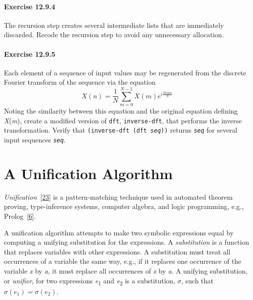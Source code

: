 \paragraph{Exercise \label{examples_g202}12.9.4}


\label{examples_s74}The recursion step creates several intermediate lists that are
immediately discarded.
Recode the recursion step to avoid any unnecessary allocation.


\paragraph{Exercise \label{examples_g203}12.9.5}


\label{examples_s75}Each element of a sequence of input values may be regenerated from
the discrete Fourier transform of the sequence via the equation
\[X(n)=\frac{1}{N}\sum_{m=0}^{N-1}X(m)e^{i\frac{2\pi{}mn}{N}}\]
Noting the similarity between this equation and the original equation
defining \textit{X}(\textit{m}), create a modified version of \texttt{dft},
\texttt{inverse-dft}, that performs the inverse transformation.
Verify that \texttt{(inverse-dft (dft \textit{seq}))} returns
\texttt{\textit{seq}} for several input sequences \texttt{\textit{seq}}.

\section{\label{examples_g204}\label{examples_h10}A Unification Algorithm\label{examples_SECTEXUNIFY}}



\textit{Unification} [\hyperref[bibliography_g241]{23}] is a pattern-matching technique
used in automated theorem proving, type-inference systems, computer
algebra, and logic programming, e.g., Prolog [\hyperref[bibliography_g224]{6}].


A \label{examples_s76}unification algorithm attempts to make two symbolic expressions
equal by computing a unifying substitution for the expressions.
A \textit{substitution} is a function that replaces variables with other
expressions.
A substitution must treat all occurrences of a variable the same way,
e.g., if it replaces one occurrence of the variable \textit{x} by \textit{a}, it must
replace all occurrences of \textit{x} by \textit{a}.
A unifying substitution, or \textit{unifier}, for two expressions \textit{e}\textsubscript{1} and
\textit{e}\textsubscript{2} is a substitution, \(\sigma\), such that \(\sigma(e_1)=\sigma(e_2)\).


